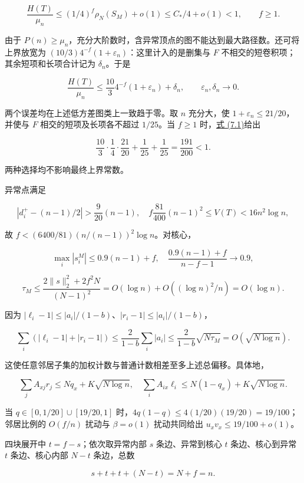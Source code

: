\documentclass[11pt,a4paper]{article}
\begin{document}
\[\frac{H(T)}{\mu_n}
\le(1/4)^f\rho_N(S_M)+o(1)
\le C_*/4+o(1)<1,\qquad f\ge1.\]

由于 \(P(n)\ge\mu_n\)，充分大阶数时，含异常顶点的图不能达到最大路径数。还可将上界放宽为 \((10/3)4^{-f}(1+\varepsilon_n)\)：这里计入的是删集与 \(F\) 不相交的短卷积项；其余短项和长项合计记为 \(\delta_n\)。于是


\begin{equation}
\frac{H(T)}{\mu_n}\le\frac{10}{3}4^{-f}(1+\varepsilon_n)+\delta_n,
\qquad \varepsilon_n,\delta_n\longrightarrow0.
\tag{7.1}
\label{eq-exceptional-bound}
\end{equation}

两个误差均在上述低方差图类上一致趋于零。取 \(n\) 充分大，使 \(1+\varepsilon_n\le21/20\)，并使与 \(F\) 相交的短项及长项各不超过 \(1/25\)。当 \(f\ge1\) 时，\hyperref[eq-exceptional-bound]{式 (7.1)}给出

\[\frac{10}{3}\cdot\frac14\cdot\frac{21}{20}+\frac1{25}+\frac1{25}
=\frac{191}{200}<1.\]

两种选择均不影响最终上界常数。

异常点满足

\[|d_i^+-(n-1)/2|>\frac9{20}(n-1),\quad
f\frac{81}{400}(n-1)^2\le V(T)<16n^2\log n,\]

故 \(f<(6400/81)(n/(n-1))^2\log n\)。对核心，

\[\max_i|s_i^M|\le0.9(n-1)+f,
\quad \frac{0.9(n-1)+f}{n-f-1}\longrightarrow0.9,\]

\[\tau_M\le\frac{2\|s\|_2^2+2f^2N}{(N-1)^2}
=O(\log n)+O((\log n)^2/n)=O(\log n).\]

因为 \(|\ell_i-1|\le|a_i|/(1-b)\)、\(|r_i-1|\le|a_i|/(1-b)\)，

\[\sum_i(|\ell_i-1|+|r_i-1|)
\le\frac2{1-b}\sum_i|a_i|
\le\frac2{1-b}\sqrt{N\tau_M}=O(\sqrt{N\log n}).\]

这使任意邻居子集的加权计数与普通计数相差至多上述总偏移。具体地，

\[\sum_jA_{xj}r_j\le Nq_x+K\sqrt{N\log n},\quad
\sum_iA_{ix}\ell_i\le N(1-q_x)+K\sqrt{N\log n}.\]

当 \(q\in[0,1/20]\cup[19/20,1]\) 时，\(4q(1-q)\le4(1/20)(19/20)=19/100\)；邻居比例的 \(O(f/n)\) 扰动与 \(\beta=o(1)\) 扰动共同给出 \(u_xv_x\le19/100+o(1)\)。

四块展开中 \(t=f-s\)；依次取异常内部 \(s\) 条边、异常到核心 \(t\) 条边、核心到异常 \(t\) 条边、核心内部 \(N-t\) 条边，总数

\[s+t+t+(N-t)=N+f=n.\]
\end{document}
